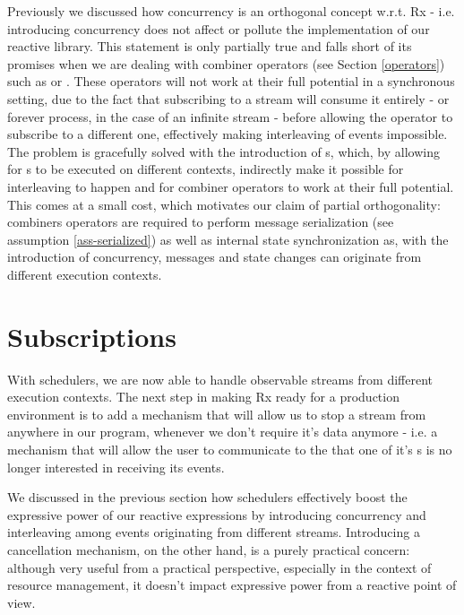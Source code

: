 Previously we discussed how concurrency is an orthogonal concept w.r.t. Rx - i.e. introducing concurrency does not affect or pollute the implementation of our reactive library. This statement is only partially true and falls short of its promises when we are dealing with combiner operators (see Section \ref{operators}) such as \code{(>>=)} or . These operators will not work at their full potential in a synchronous setting, due to the fact that subscribing to a stream will consume it entirely - or forever process, in the case of an infinite stream - before allowing the operator to subscribe to a different one, effectively making interleaving of events impossible. The problem is gracefully solved with the introduction of s, which, by allowing for s to be executed on different contexts, indirectly make it possible for interleaving to happen and for combiner operators to work at their full potential. This comes at a small cost, which motivates our claim of partial orthogonality: combiners operators are required to perform message serialization (see assumption \ref{ass-serialized}) as well as internal state synchronization as, with the introduction of concurrency, messages and state changes can originate from different execution contexts.


\section{Subscriptions}
\label{sec:subscriptions}

With schedulers, we are now able to handle observable streams from different execution contexts. The next step in making Rx ready for a production environment is to add a mechanism that will allow us to stop a stream from anywhere in our program, whenever we don't require it's data anymore - i.e. a mechanism that will allow the user to communicate to the  that one of it's s is no longer interested in receiving its events. 

We discussed in the previous section how schedulers effectively boost the expressive power of our reactive expressions by introducing concurrency and interleaving among events originating from different streams. Introducing a cancellation mechanism, on the other hand, is a purely practical concern: although very useful from a practical perspective, especially in the context of resource management, it doesn't impact expressive power from a reactive point of view.

